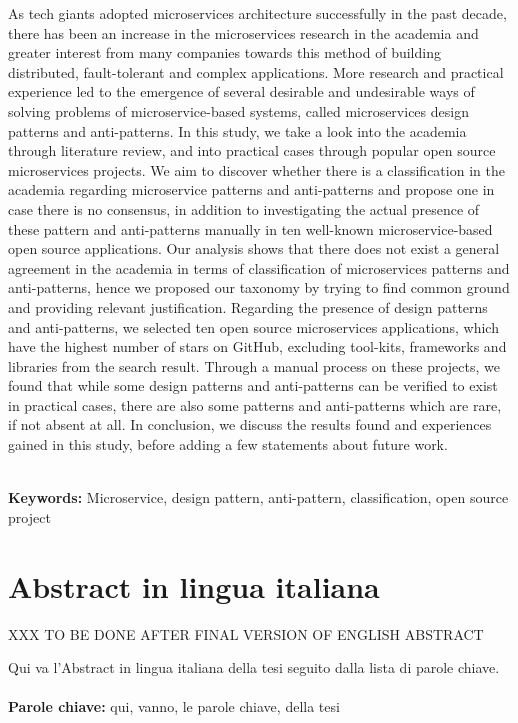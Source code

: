 \documentclass{Configuration_Files/PoliMi3i_thesis}
\begin{document}
As tech giants adopted microservices architecture successfully in the past decade, there has been an increase in the microservices research in the academia and greater interest from many companies towards this method of building distributed, fault-tolerant and complex applications.
More research and practical experience led to the emergence of several desirable and undesirable ways of solving problems of microservice-based systems, called microservices design patterns and anti-patterns.
In this study, we take a look into the academia through literature review, and into practical cases through popular open source microservices projects.
We aim to discover whether there is a classification in the academia regarding microservice patterns and anti-patterns and propose one in case there is no consensus, in addition to investigating the actual presence of these pattern and anti-patterns manually in ten well-known microservice-based open source applications.
Our analysis shows that there does not exist a general agreement in the academia in terms of classification of microservices patterns and anti-patterns, hence we proposed our taxonomy by trying to find common ground and providing relevant justification.
Regarding the presence of design patterns and anti-patterns, we selected ten open source microservices applications, which have the highest number of stars on GitHub, excluding tool-kits, frameworks and libraries from the search result.
Through a manual process on these projects, we found that while some design patterns and anti-patterns can be verified to exist in practical cases, there are also some patterns and anti-patterns which are rare, if not absent at all.
In conclusion, we discuss the results found and experiences gained in this study, before adding a few statements about future work.

\\

\textbf{Keywords:} Microservice, design pattern, anti-pattern, classification, open source project %

\chapter*{Abstract in lingua italiana}
XXX TO BE DONE AFTER FINAL VERSION OF ENGLISH ABSTRACT

Qui va l'Abstract in lingua italiana della tesi seguito dalla lista di parole chiave.
\\
\\
\textbf{Parole chiave:} qui, vanno, le parole chiave, della tesi %
\end{document}
